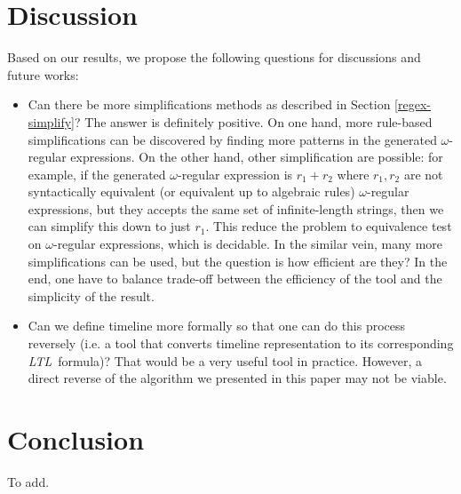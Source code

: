 \documentclass[preprint,12pt]{elsarticle}
\theoremstyle{definition}
\theoremstyle{remark}
\newcommand{\ltl}{\textit{LTL}}
\begin{document}
\section{Discussion}
Based on our results, we propose the following questions for discussions and future works:
\begin{itemize}
    \item Can there be more simplifications methods as described in Section \ref{regex-simplify}? The answer is definitely positive. On one hand, more rule-based simplifications can be discovered by finding more patterns in the generated $\omega$-regular expressions. On the other hand, other simplification are possible: for example, if the generated $\omega$-regular expression is $r_1 + r_2$ where $r_1, r_2$ are not syntactically equivalent (or equivalent up to algebraic rules) $\omega$-regular expressions, but they accepts the same set of infinite-length strings, then we can simplify this down to just $r_1$. This reduce the problem to equivalence test on $\omega$-regular expressions, which is decidable. In the similar vein, many more simplifications can be used, but the question is how efficient are they? In the end, one have to balance trade-off between the efficiency of the tool and the simplicity of the result.
    \item Can we define timeline more formally so that one can do this process reversely (i.e. a tool that converts timeline representation to its corresponding \ltl\ formula)? That would be a very useful tool in practice. However, a direct reverse of the algorithm we presented in this paper may not be viable.
\end{itemize}

\section{Conclusion}
To add. %

\appendix
\end{document}
